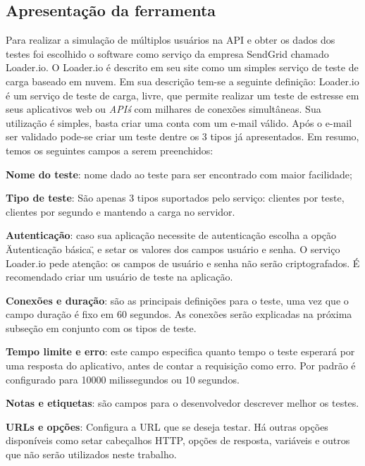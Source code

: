 \subsection{Apresentação da ferramenta}
  
  Para realizar a simulação de múltiplos usuários na \ac{API} e obter os dados dos testes foi 
  escolhido o software como serviço da empresa SendGrid chamado Loader.io. O Loader.io é descrito em seu site
   como um simples serviço de teste de carga baseado em nuvem. Em sua descrição tem-se a seguinte
  definição: Loader.io é um serviço de teste de carga, livre, que permite realizar um teste de estresse em 
  seus aplicativos web ou \textit{API\'s} com milhares de conexões simultâneas. \cite{Loader.io:2014}
  Sua utilização é simples, basta criar uma conta com um e-mail válido. Após o e-mail ser validado pode-se 
  criar um teste dentre os 3 tipos já apresentados. Em resumo, temos os seguintes campos a serem preenchidos:
  
  \textbf{Nome do teste}: nome dado ao teste para ser encontrado com maior facilidade;
  
  \textbf{Tipo de teste}: São apenas 3 tipos suportados pelo serviço: clientes por teste, clientes por segundo e mantendo 
  a carga no servidor.
  
  \textbf{Autenticação}: caso sua aplicação necessite de autenticação escolha a opção \"Autenticação básica\",
  e setar os valores dos campos usuário e senha. O serviço Loader.io pede atenção: 
  os campos de usuário e senha não serão criptografados. É recomendado criar um usuário de teste na aplicação.
  
  \textbf{Conexões e duração}: são as principais definições para o teste, uma vez que o campo duração
  é fixo em 60 segundos. As conexões serão explicadas na próxima subseção em conjunto com os tipos de teste.
  
  \textbf{Tempo limite e erro}: este campo especifica quanto tempo o teste esperará por uma resposta do aplicativo, antes
  de contar a requisição como erro. Por padrão é configurado para 10000 milissegundos ou 10 segundos.
  
  \textbf{Notas e etiquetas}: são campos para o desenvolvedor descrever  melhor os testes.
  
  \textbf{URLs e opções}: Configura a \ac{URL} que se deseja testar. Há outras opções disponíveis como setar cabeçalhos \ac{HTTP},
  opções de resposta, variáveis e outros que não serão utilizados neste trabalho.
  
